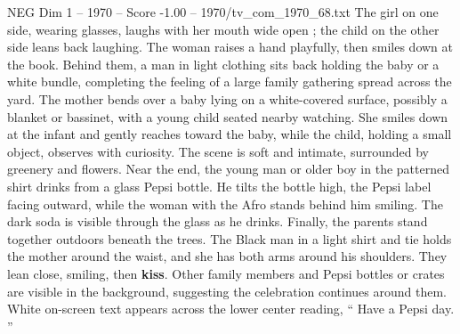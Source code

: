 \begin{textsample}{NEG Dim 1 – 1970 – Score -1.00 – 1970/tv\_com\_1970\_68.txt}
The girl on one side, wearing glasses, laughs with her mouth wide open ; the child on the other side leans back laughing.
The woman raises a hand playfully, then smiles down at the book.
Behind them, a man in light clothing sits back holding the baby or a white bundle, completing the feeling of a large family gathering spread across the yard.
The mother bends over a baby lying on a white-covered surface, possibly a blanket or bassinet, with a young child seated nearby watching.
She smiles down at the infant and gently reaches toward the baby, while the child, holding a small object, observes with curiosity.
The scene is soft and intimate, surrounded by greenery and flowers.
Near the end, the young man or older boy in the patterned shirt drinks from a glass Pepsi bottle.
He tilts the bottle high, the Pepsi label facing outward, while the woman with the Afro stands behind him smiling.
The dark soda is visible through the glass as he drinks.
Finally, the parents stand together outdoors beneath the trees.
The Black man in a light shirt and tie holds the mother around the waist, and she has both arms around his shoulders.
They lean close, smiling, then \textbf{kiss}.
Other family members and Pepsi bottles or crates are visible in the background, suggesting the celebration continues around them.
White on-screen text appears across the lower center reading, “ Have a Pepsi day. ”

\end{textsample}
